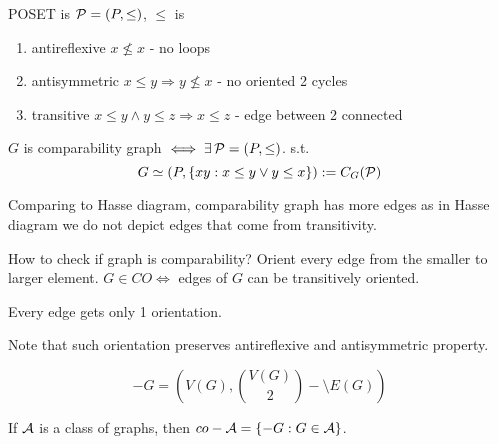 \begin{definition}
	POSET is $\operatorname{\mathcal{P}} = (P, \leq)$, $\leq$ is
	\begin{enumerate}
		\item antireflexive $x \not \leq x$ - no loops
		\item antisymmetric $x \leq y \Rightarrow y \not \leq x$ - no oriented 2 cycles
		\item transitive $x \leq y \land y \leq z \Rightarrow x \leq z$ - edge between 2 connected
	\end{enumerate}

	$G$ is comparability graph $\iff \exists \operatorname{\mathcal{P}} = (P, \leq)$. s.t.
	\[ G \simeq (P, \{ xy: x\leq y \lor y \leq x \}) := C_G(\operatorname{\mathcal{P}}) \]

	Comparing to Hasse diagram, comparability graph has more edges as in Hasse diagram we do not depict edges that come from transitivity.
\end{definition}

\begin{observation}
	How to check if graph is comparability?
	Orient every edge from the smaller to larger element.
	$G \in CO \iff$ edges of $G$ can be transitively oriented.

	Every edge gets only 1 orientation.

	Note that such orientation preserves antireflexive and antisymmetric property.
\end{observation}

\begin{notation}
	\[ -G = \left(V(G), \binom{V(G)}{2} - \setminus E(G)\right) \]

	If $\operatorname{\mathcal{A}}$ is a class of graphs, then $co-\operatorname{\mathcal{A}} = \{ -G: G \in \operatorname{\mathcal{A}} \}$.
\end{notation}

